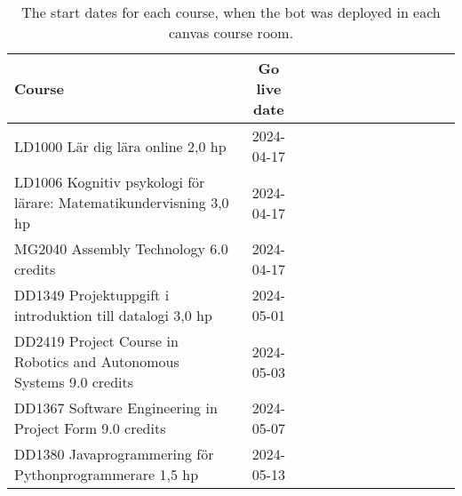 \begin{table}[H]
\centering
{\scriptsize
\begin{tabular}{@{}lcccccccccccc@{}}
\toprule
\textbf{Course}                                                         & \textbf{Go live date}     \\ \midrule
LD1000 Lär dig lära online 2,0 hp                                       & 2024-04-17                \\
LD1006 Kognitiv psykologi för lärare: Matematikundervisning 3,0 hp      & 2024-04-17                \\
MG2040 Assembly Technology 6.0 credits                                  & 2024-04-17                \\
DD1349 Projektuppgift i introduktion till datalogi 3,0 hp               & 2024-05-01                \\
DD2419 Project Course in Robotics and Autonomous Systems 9.0 credits    & 2024-05-03                \\
DD1367 Software Engineering in Project Form 9.0 credits                 & 2024-05-07                \\
DD1380 Javaprogrammering för Pythonprogrammerare 1,5 hp                 & 2024-05-13                \\
\bottomrule
\end{tabular}
}
\vspace{2mm}
\caption{The start dates for each course, when the bot was deployed in each canvas course room.}
\label{tab:course_start_dates}
\end{table}
